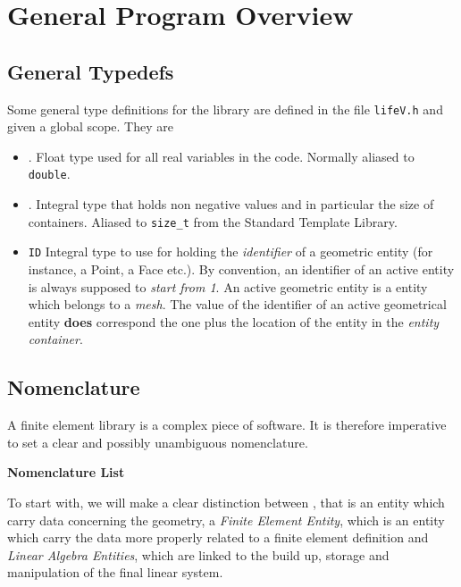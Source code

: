 \chapter{General Program Overview} 
\label{cha:gener-progr-overv}

\section{General Typedefs}
\label{s:typedefs}

Some general type definitions for the library are defined in the file
\texttt{lifeV.h} and given a global scope.
They are
\begin{itemize}
\item \texttt{}.  Float type used for all real variables in the code.
  Normally aliased to \texttt{double}.
\item \texttt{}. Integral type that holds non negative values and in
  particular the size of containers.  Aliased to
  \texttt{size\_t} from the Standard Template Library.
\item \texttt{ID} Integral type to use for holding the
  \emph{identifier} of a geometric entity (for instance, a Point, a Face
  etc.). By convention, an identifier of an active entity is always
  supposed to \emph{start from 1}. An active geometric entity is a
  entity which belongs to a \emph{mesh}. The value of the identifier of
  an active geometrical entity \textbf{does} correspond the one plus the
  location of the entity in the \emph{entity container}.
 \end{itemize}
\section{Nomenclature}
A finite element library is a complex piece of software. It is therefore
imperative to set a clear and possibly unambiguous nomenclature.


\centerline{\textbf{Nomenclature List}}
\smallskip

To start with, we will make a clear distinction between
\emph{}, that is an entity
which carry data concerning the geometry, a \emph{Finite Element
  Entity}, which is an entity which carry the data more properly
related to a finite element definition and \emph{Linear Algebra
  Entities}, which are linked to the build up, storage and
manipulation of the final linear system.
